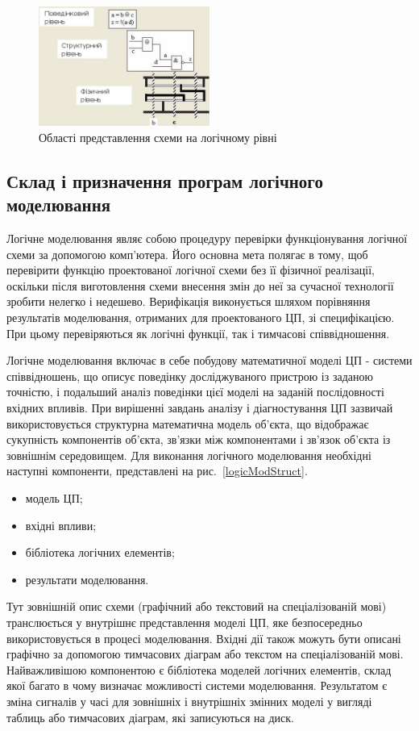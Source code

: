 \documentclass[12pt,a4paper]{article}
\begin{document}
\begin{figure}[h]
  \centering
    \includegraphics[width=0.5\textwidth]{logic-level-presentation-domains.jpg}
  \caption{Області представлення схеми на логічному рівні\label{logicLvl}}
\end{figure}

\subsection{Склад і призначення програм логічного моделювання}

Логічне моделювання являє собою процедуру перевірки функціонування логічної схеми за допомогою комп'ютера. Його основна мета полягає в тому, щоб перевірити функцію проектованої логічної схеми без її фізичної реалізації, оскільки після виготовлення схеми внесення змін до неї за сучасної технології зробити нелегко і недешево. Верифікація виконується шляхом порівняння результатів моделювання, отриманих для проектованого ЦП, зі специфікацією. При цьому перевіряються як логічні функції, так і тимчасові співвідношення.

Логічне моделювання включає в себе побудову математичної моделі ЦП - системи співвідношень, що описує поведінку досліджуваного пристрою із заданою точністю, і подальший аналіз поведінки цієї моделі на заданій послідовності вхідних впливів. При вирішенні завдань аналізу і діагностування ЦП зазвичай використовується структурна математична модель об'єкта, що відображає сукупність компонентів об'єкта, зв'язки між компонентами і зв'язок об'єкта із зовнішнім середовищем. Для виконання логічного моделювання необхідні наступні компоненти, представлені на рис.~\ref{logicModStruct}.
\begin{itemize}
  \item модель ЦП;
  \item вхідні впливи;
  \item бібліотека логічних елементів;
  \item результати моделювання.
\end{itemize}
Тут зовнішній опис схеми (графічний або текстовий на спеціалізованій мові) транслюється у внутрішнє представлення моделі ЦП, яке безпосередньо використовується в процесі моделювання. Вхідні дії також можуть бути описані графічно за допомогою тимчасових діаграм або текстом на спеціалізованій мові. Найважливішою компонентою є бібліотека моделей логічних елементів, склад якої багато в чому визначає можливості системи моделювання. Результатом є зміна сигналів у часі для зовнішніх і внутрішніх змінних моделі у вигляді таблиць або тимчасових діаграм, які записуються на диск.
\end{document}
